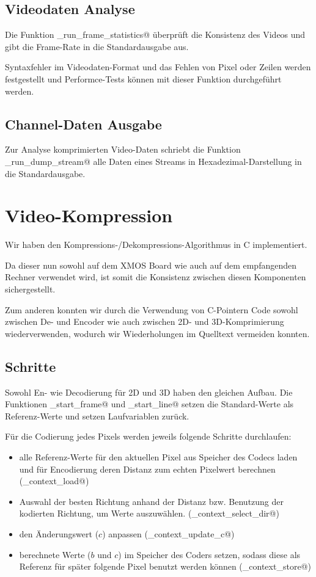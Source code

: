 \subsection{Videodaten Analyse}
Die Funktion \lstinline@tst_run_frame_statistics@ überprüft die Konsistenz des
Videos und gibt die Frame-Rate in die Standardausgabe aus.

Syntaxfehler im Videodaten-Format und das Fehlen von Pixel oder Zeilen 
werden festgestellt und Performce-Tests können mit dieser Funktion durchgeführt
werden.

\subsection{Channel-Daten Ausgabe}
Zur Analyse komprimierten Video-Daten schriebt die Funktion 
\lstinline@tst_run_dump_stream@ alle Daten eines Streams in
Hexadezimal-Darstellung in die Standardausgabe.



\section{Video-Kompression}

Wir haben den Kompressions-/Dekompressions-Algorithmus in C implementiert.

Da dieser nun sowohl auf dem XMOS Board wie auch auf dem empfangenden Rechner 
verwendet wird, ist somit die Konsistenz zwischen diesen Komponenten sichergestellt.

Zum anderen konnten wir durch die Verwendung von C-Pointern Code sowohl zwischen 
De- und Encoder wie auch zwischen 2D- und 3D-Komprimierung wiederverwenden,
wodurch wir Wiederholungen im Quelltext vermeiden konnten.

\subsection{Schritte}
Sowohl En- wie Decodierung für 2D und 3D haben den gleichen Aufbau.
Die Funktionen \lstinline@cmpr_start_frame@ und \lstinline@cmpr_start_line@
setzen die Standard-Werte als Referenz-Werte und setzen Laufvariablen zurück.

Für die Codierung jedes Pixels werden jeweils folgende Schritte durchlaufen:
\begin{itemize}
\item alle Referenz-Werte für den aktuellen Pixel aus Speicher des Codecs laden 
      und für Encodierung deren Distanz zum echten Pixelwert berechnen
	(\lstinline@cmpr_context_load@)
\item Auswahl der besten Richtung anhand der Distanz bzw. Benutzung
      der kodierten Richtung, um Werte auszuwählen.
	(\lstinline@cmpr_context_select_dir@)
\item den Änderungswert ($c$) anpassen
	(\lstinline@cmpr_context_update_c@)
\item berechnete Werte ($b$ und $c$) im Speicher des Coders setzen, sodass diese 
      als Referenz für später folgende Pixel benutzt werden können
	(\lstinline@cmpr_context_store@)
\end{itemize}

